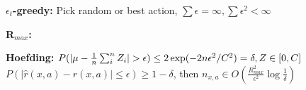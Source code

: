 \textbf{$\epsilon_t$-greedy:} Pick random or best action, $\sum \epsilon = \infty, \sum \epsilon^2 < \infty$\\
\begin{comment}
	If $\epsilon$ satisfies the conditions, it converges, but can take some time to eliminate clearly suboptimal actions\\
\end{comment}

\textbf{R$_{max}$:} \\
\begin{comment}
	How can we model optimism for our estimated MDP's?\\
	If you don't know r and p, we introduce a fairy tale state $P(x^*|x,y) = 1$, $r(x^*, a) = R_{max}$. We set $r(x,a) = R_{max}$ and $P(x^*|x,a)$ for all states x and actions a.\\
	The algorithm keeps track of how many times we visited certain state-action pairs.\\
	We then use the initial policy $\pi$ and update $r(x,a)$ and $p(x'|x,a)$ for every transition that occured. If we observed enough transitions, we recompute policy $\pi$ and do it all over again.\\
	\textbf{How many samples?} Using Hoeffinger bound, if samples are i.i.d. with mean $\mu$ and bounded in $[0,C]$, we have error estimate $P(|\mu - \frac{1}{n}\sum_i^n Z_i| > \epsilon) \leq 2 \exp(-2 n \epsilon^2 / C^2)$\\
	F.e. $P(|\hat{r}(x,a) - r(x,a)| > \epsilon) \leq 2 \exp(-2 n_{x,a} \epsilon^2 / R^2_{max}) = \delta$, then $n_{x,a} \in O(\frac{R_{max}^2}{\epsilon^2} \log \frac{1}{\delta})$\\
\end{comment}

\textbf{Hoefding:} $P(|\mu - \frac{1}{n}\sum_i^n Z_i| > \epsilon) \leq 2 \exp(-2 n \epsilon^2 / C^2) = \delta, \\
Z \in [0,C]$\\
$P(|\hat{r}(x,a) - r(x,a)| \leq \epsilon) \geq 1-\delta$, then $n_{x,a} \in O(\frac{R_{max}^2}{\epsilon^2} \log \frac{1}{\delta})$\\
\begin{comment}
	The bound tells us how many samples we need to be under a certain error threshold.
	$R_{max}$ bounds the value of Z, as required.\\
\end{comment}

